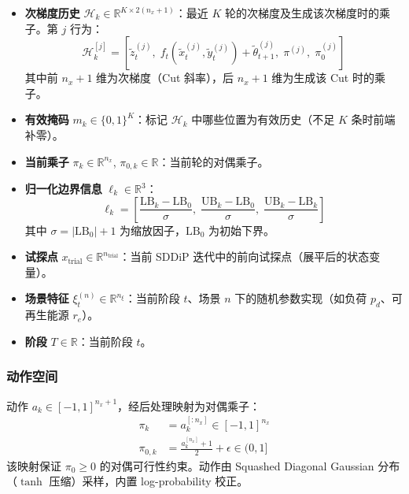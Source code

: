 \documentclass[11pt]{ctexart}
\begin{document}
\begin{itemize}[itemsep=2pt, topsep=2pt]
    \item \textbf{次梯度历史} $\mathcal{H}_k \in \mathbb{R}^{K \times 2(n_x+1)}$：最近 $K$ 轮的次梯度及生成该次梯度时的乘子。第 $j$ 行为：
    \begin{equation}
    \mathcal{H}_k^{[j]} = \left[ \tilde{z}_t^{(j)}, \; f_t(\tilde{x}_t^{(j)}, \tilde{y}_t^{(j)}) + \tilde{\theta}_{t+1}^{(j)}, \; \pi^{(j)}, \; \pi_0^{(j)} \right]
    \end{equation}
    其中前 $n_x + 1$ 维为次梯度（Cut 斜率），后 $n_x + 1$ 维为生成该 Cut 时的乘子。

    \item \textbf{有效掩码} $m_k \in \{0, 1\}^K$：标记 $\mathcal{H}_k$ 中哪些位置为有效历史（不足 $K$ 条时前端补零）。

    \item \textbf{当前乘子} $\pi_k \in \mathbb{R}^{n_x}$, $\pi_{0,k} \in \mathbb{R}$：当前轮的对偶乘子。

    \item \textbf{归一化边界信息} $\ell_k \in \mathbb{R}^3$：
    \begin{equation}
    \ell_k = \left[ \frac{\mathrm{LB}_k - \mathrm{LB}_0}{\sigma}, \; \frac{\mathrm{UB}_k - \mathrm{LB}_0}{\sigma}, \; \frac{\mathrm{UB}_k - \mathrm{LB}_k}{\sigma} \right]
    \end{equation}
    其中 $\sigma = |\mathrm{LB}_0| + 1$ 为缩放因子，$\mathrm{LB}_0$ 为初始下界。

    \item \textbf{试探点} $x_{\text{trial}} \in \mathbb{R}^{n_{\text{trial}}}$：当前 SDDiP 迭代中的前向试探点（展平后的状态变量）。

    \item \textbf{场景特征} $\xi_t^{(n)} \in \mathbb{R}^{n_\xi}$：当前阶段 $t$、场景 $n$ 下的随机参数实现（如负荷 $p_d$、可再生能源 $r_e$）。
    \item \textbf{阶段} $T \in \mathbb{R}$：当前阶段 $t$。
\end{itemize}

\subsubsection{动作空间}

动作 $a_k \in [-1, 1]^{n_x + 1}$，经后处理映射为对偶乘子：
\begin{align}
\pi_k &= a_k^{[:n_x]} \in [-1, 1]^{n_x} \\
\pi_{0,k} &= \frac{a_k^{[n_x]} + 1}{2} + \epsilon \in (0, 1]
\end{align}
该映射保证 $\pi_0 \ge 0$ 的对偶可行性约束。动作由 Squashed Diagonal Gaussian 分布（$\tanh$ 压缩）采样，内置 log-probability 校正。
\end{document}
